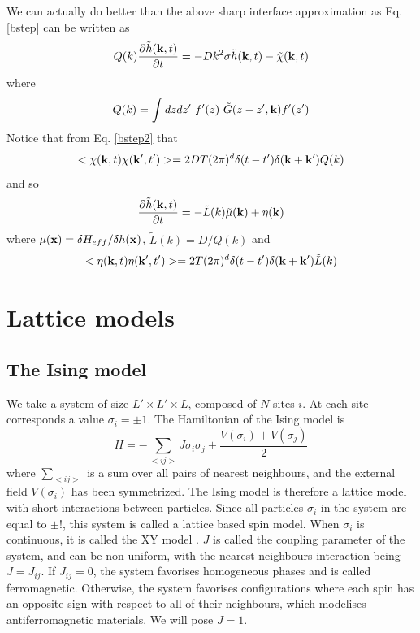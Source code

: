 We can actually do better than the above sharp interface approximation as Eq. \eqref{bstep} can be written as
\begin{equation}
Q(k)\frac{\partial\tilde h({\bf k},t)}{\partial t} = -Dk^2\sigma \tilde h({\bf k},t) - \tilde \chi({\bf k},t)
\label{bstep2}
\end{equation}
where 
\begin{equation}
Q(k)= \int dzdz' \ f'(z)\ \tilde G(z-z',{\bf k}) f'(z')
\end{equation}
Notice that from Eq. \eqref{bstep2} that
\begin{equation}
< \chi({\bf k},t)\chi({\bf k}',t')> = 2DT(2\pi)^d \delta(t-t') \delta({\bf k}+{\bf k'}) Q(k)\end{equation}
and so 
\begin{equation}
\frac{\partial\tilde h({\bf k},t)}{\partial t}= -\tilde L(k) \tilde \mu({\bf k}) + \eta({\bf k})
\end{equation}
where $\mu({\bf x})=\delta H_{eff}/\delta h({\bf x}) $, $\tilde L(k) = D/Q(k)$ and 
\begin{equation}
< \eta({\bf k},t)\eta({\bf k}',t')> = 2T(2\pi)^d \delta(t-t') \delta({\bf k}+{\bf k'}) \tilde L(k)
\end{equation}

    \section{Lattice models}

    \subsection{The Ising model}


We take a system of size $L'\times L' \times L$, composed of $N$ sites $i$. At each site corresponds a value $\sigma_i =\pm1$. The Hamiltonian of the Ising model is 
\begin{equation}
	H =  - \sum_{<ij>} J \sigma_i \sigma_j + \frac{V(\sigma_i)+V(\sigma_j)}{2}
	\label{hamil-ising}
\end{equation}
where $\sum_{< ij >}$ is a sum over all pairs of nearest neighbours, and the external field $V(\sigma_i)$ has been symmetrized. The Ising model\cite{niss_history_2005,niss_history_2009} is therefore a lattice model with short interactions between particles. Since all particles $\sigma_i$ in the system are equal to $\pm!$, this system is called a lattice based spin model. When $\sigma_i$ is continuous, it is called the XY model \cite{gupta_phase_1988}.
$J$ is called the coupling parameter of the system, and can be non-uniform, with the nearest neighbours interaction being $J = J_{ij}$. If $ J_{ij} =0$, the system favorises homogeneous phases and is called ferromagnetic. Otherwise, the system favorises configurations where each spin has an opposite sign with respect to all of their neighbours, which modelises antiferromagnetic materials. We will pose $J=1$.

